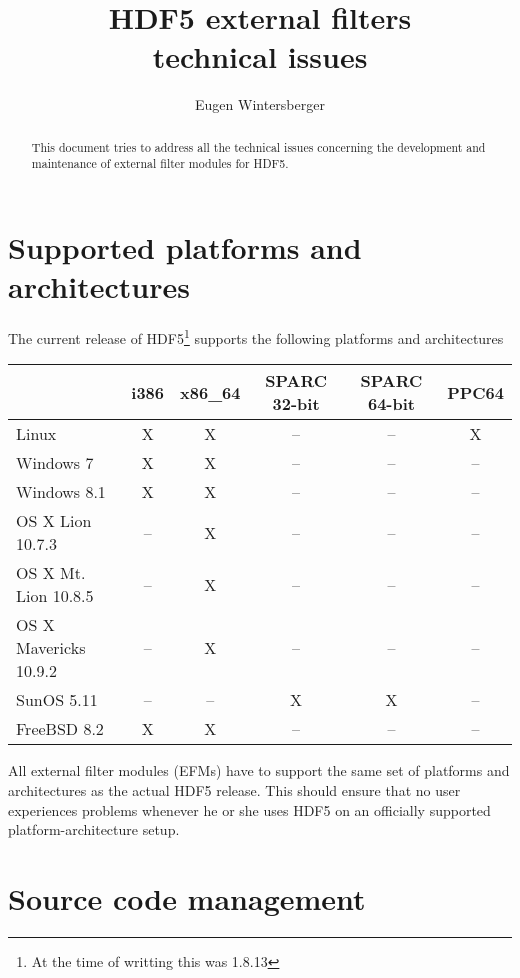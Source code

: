 \documentclass{scrartcl}
\title{
       {\huge HDF5 external filters}\\
       technical issues}
\author{Eugen Wintersberger}
\begin{document}
\maketitle
\begin{abstract}
    This document tries to address all the technical issues concerning 
    the development and maintenance of external filter modules for HDF5. 
\end{abstract}

\section{Supported platforms and architectures}

The current release of HDF5\footnote{At the time of writting this was 1.8.13} 
supports the following platforms and architectures
\begin{center}
\begin{tabular}{l|c|c|c|c|c}
    & i386 & x86\_64 & SPARC 32-bit & SPARC 64-bit & PPC64 \\
    \hline\hline
    Linux & X  &  X & -- & -- & X \\
    \hline
    Windows 7 & X  & X & -- & -- & -- \\
    \hline
    Windows 8.1 & X & X & -- & -- & -- \\
    \hline
    OS X Lion 10.7.3 & -- & X & -- & -- & -- \\
    \hline
    OS X Mt. Lion 10.8.5 & -- & X & -- & -- & -- \\
    \hline
    OS X Mavericks 10.9.2 & -- & X & -- & -- & -- \\
    \hline
    SunOS 5.11 & -- & -- & X & X & -- \\
    \hline
    FreeBSD 8.2 & X & X & -- & -- & -- \\
    \hline
\end{tabular}
\end{center}
All external filter modules (EFMs) have to support the same set of platforms and 
architectures as the actual HDF5 release. This should ensure that no user 
experiences problems whenever he or she uses HDF5 on an officially supported
platform-architecture setup.

\section{Source code management}
\end{document}
